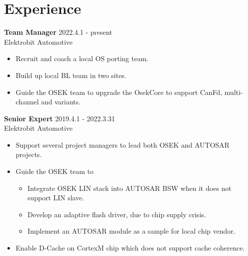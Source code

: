 
\section{Experience}
\textbf{Team Manager} \hfill 2022.4.1 - present \\
        Elektrobit Automotive
        \begin{itemize}  \itemsep -2pt %
            \item Recruit and coach a local OS porting team.
            \item Build up local BL team in two sites.
            \item Guide the OSEK team to upgrade the OsekCore to support CanFd, multi-channel and variants.
        \end{itemize}

\textbf{Senior Expert} \hfill 2019.4.1 - 2022.3.31 \\
        Elektrobit Automotive
        \begin{itemize}  \itemsep -2pt %
            \item Support several project managers to lead both OSEK and AUTOSAR projects.
            \item Guide the OSEK team to
            \begin{itemize} \itemsep -2pt
                \item Integrate OSEK LIN stack into AUTOSAR BSW when it does not support LIN slave.
                \item Develop an adaptive flash driver, due to chip supply crisis.
                \item Implement an AUTOSAR module as a sample for local chip vendor.
            \end{itemize}
            \item Enable D-Cache on CortexM chip which does not support cache coherence.
        \end{itemize}

